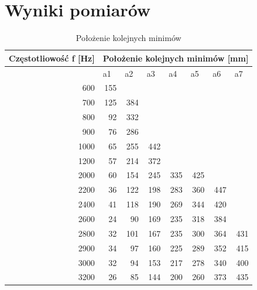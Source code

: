 \documentclass{article}
\begin{document}
\section{Wyniki pomiarów}

\begin{table}[htbp]
\centering
\begin{tabular}{|r|r|r|r|r|r|l|l|}
\hline
\multicolumn{1}{|c|}{Częstotliowość f [Hz]} & \multicolumn{ 7}{c|}{Położenie kolejnych minimów [mm]} \\ \hline
\multicolumn{1}{|l|}{} & \multicolumn{1}{l|}{a1} & \multicolumn{1}{l|}{a2} & \multicolumn{1}{l|}{a3} & \multicolumn{1}{l|}{a4} & \multicolumn{1}{l|}{a5} & a6 & a7 \\ \hline
600 & 155 & \multicolumn{1}{l|}{} & \multicolumn{1}{l|}{} & \multicolumn{1}{l|}{} & \multicolumn{1}{l|}{} &  &  \\ \hline
700 & 125 & 384 & \multicolumn{1}{l|}{} & \multicolumn{1}{l|}{} & \multicolumn{1}{l|}{} &  &  \\ \hline
800 & 92 & 332 & \multicolumn{1}{l|}{} & \multicolumn{1}{l|}{} & \multicolumn{1}{l|}{} &  &  \\ \hline
900 & 76 & 286 & \multicolumn{1}{l|}{} & \multicolumn{1}{l|}{} & \multicolumn{1}{l|}{} &  &  \\ \hline
1000 & 65 & 255 & 442 & \multicolumn{1}{l|}{} & \multicolumn{1}{l|}{} &  &  \\ \hline
1200 & 57 & 214 & 372 & \multicolumn{1}{l|}{} & \multicolumn{1}{l|}{} &  &  \\ \hline
2000 & 60 & 154 & 245 & 335 & 425 &  &  \\ \hline
2200 & 36 & 122 & 198 & 283 & 360 & \multicolumn{1}{r|}{447} &  \\ \hline
2400 & 41 & 118 & 190 & 269 & 344 & \multicolumn{1}{r|}{420} &  \\ \hline
2600 & 24 & 90 & 169 & 235 & 318 & \multicolumn{1}{r|}{384} &  \\ \hline
2800 & 32 & 101 & 167 & 235 & 300 & \multicolumn{1}{r|}{364} & \multicolumn{1}{r|}{431} \\ \hline
2900 & 34 & 97 & 160 & 225 & 289 & \multicolumn{1}{r|}{352} & \multicolumn{1}{r|}{415} \\ \hline
3000 & 32 & 94 & 153 & 217 & 278 & \multicolumn{1}{r|}{340} & \multicolumn{1}{r|}{400} \\ \hline
3200 & 26 & 85 & 144 & 200 & 260 & \multicolumn{1}{r|}{373} & \multicolumn{1}{r|}{435} \\ \hline
\end{tabular}
\label{}
\caption{Położenie kolejnych minimów}
\end{table}
\end{document}
